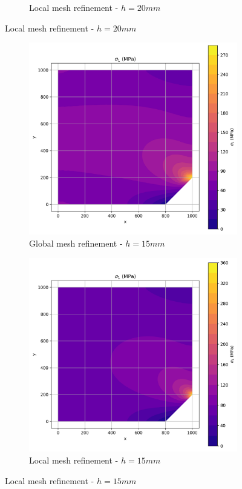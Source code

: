 \begin{figure}[H]
\begin{subfigure}[b]{0.45\textwidth}
    \caption{Local mesh refinement - $h=20mm$}
    \label{fig:img2}
  \end{subfigure}
\end{figure}

\begin{figure}[H]
  \centering
  \begin{subfigure}[b]{0.45\textwidth}
    \centering
    \includegraphics[width=\textwidth]{GRAFICOS/Quad4/1.75mm_global/resultados - sigma_1.png}
    \caption{Global mesh refinement - $h=15mm$}
    \label{fig:img11}
  \end{subfigure}
  \hfill
  \begin{subfigure}[b]{0.45\textwidth}
    \centering
    \includegraphics[width=\textwidth]{GRAFICOS/Quad4/1.75mm_local/resultados - sigma_1.png}
    \caption{Local mesh refinement - $h=15mm$}
    \label{fig:img21}
  \end{subfigure}
\end{figure}

